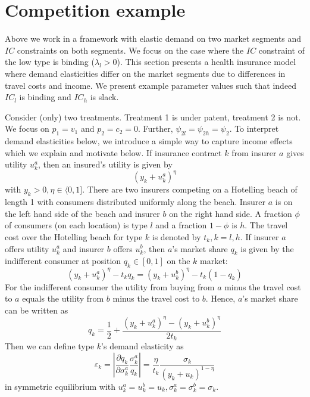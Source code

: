 \documentclass[12pt,english,a4paper]{article}
\begin{document}
\section{Competition example \label{sec:example}}
\label{sec:org349009d}

Above we work in a framework with elastic demand on two market segments and \(IC\) constraints on both segments. We focus on the case where the \(IC\) constraint of the low type is binding (\(\lambda_l>0\)). This section presents a health insurance model where demand elasticities differ on the market segments due to differences in travel costs and income. We present example parameter values such that indeed \(IC_l\) is binding and \(IC_h\) is slack.

Consider (only) two treatments. Treatment 1 is under patent, treatment 2 is not. We focus on \(p_1=v_1\) and \(p_2=c_2=0\). Further, \(\psi_{2l}=\psi_{2h}=\psi_2\). To interpret demand elasticities below, we introduce a simple way to capture income effects which we explain and motivate below. If insurance contract \(k\) from insurer \(a\) gives utility \(u_k^a\), then an insured's utility is given by
\begin{equation}
\label{eq:50}
(y_k+u_k^a)^{\eta}
\end{equation}
with \(y_k>0, \eta \in \langle 0,1]\). There are two insurers competing on a Hotelling beach of length 1 with consumers distributed uniformly along the beach. Insurer \(a\) is on the left hand side of the beach and insurer \(b\) on the right hand side. A fraction \(\phi\) of consumers (on each location) is type \(l\) and a fraction \(1-\phi\) is \(h\). The travel cost over the Hotelling beach for type \(k\) is denoted by \(t_k, k=l,h\). If insurer \(a\) offers utility \(u_k^a\) and insurer \(b\) offers \(u_k^b\), then \(a\)'s market share \(q_k\) is given by the indifferent consumer at position \(q_k \in [0,1]\) on the \(k\) market:
\begin{equation}
\label{eq:18}
(y_k+u_k^a)^{\eta} - t_k q_k = (y_k+u_k^b)^{\eta} - t_k (1-q_k)
\end{equation}
For the indifferent consumer the utility from buying from \(a\) minus the travel cost to \(a\) equals the utility from \(b\) minus the travel cost to \(b\). Hence, \(a\)'s market share can be written as
\begin{equation}
\label{eq:19}
q_k = \frac{1}{2} + \frac{(y_k+u_k^a)^{\eta} - (y_k+u_k^b)^{\eta}}{2t_k}
\end{equation}
Then we can define type \(k\)'s demand elasticity as
\begin{equation}
\label{eq:51}
\varepsilon_k = \left| \frac{\partial q_k}{\partial \sigma_k^a} \frac{\sigma_k^a}{q_k} \right| = \frac{\eta}{t_k}\frac{\sigma_k}{(y_k+u_k)^{1-\eta}}
\end{equation}
in symmetric equilibrium with \(u_k^a=u_k^b=u_k,\sigma_k^a=\sigma_k^{b}=\sigma_k\).
\end{document}
